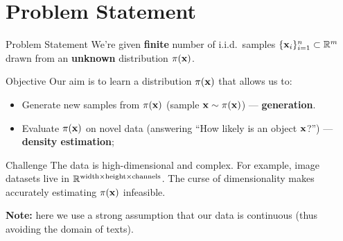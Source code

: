 \documentclass{beamer}
\begin{document}
\section{Problem Statement}
\begin{frame}{Problem Statement}
	We're given \textbf{finite} number of i.i.d.\ samples $\{\mathbf{x}_i\}_{i=1}^n \subset \mathbb{R}^m$ drawn from an \textbf{unknown} distribution $\pi(\mathbf{x})$.
	\eqpause
	\begin{block}{Objective}
		Our aim is to learn a distribution $\pi(\mathbf{x})$ that allows us to: 
		\begin{itemize}
		    \item Generate new samples from $\pi(\mathbf{x})$ (sample $\mathbf{x} \sim \pi(\mathbf{x})$) --- \textbf{generation}.		    
			\eqpause
		    \item Evaluate $\pi(\mathbf{x})$ on novel data (answering ``How likely is an object $\mathbf{x}$?'') --- \textbf{density estimation}; 
		\end{itemize}
	\end{block}
	\eqpause
	\begin{block}{Challenge}
		The data is high-dimensional and complex. For example, image datasets live in $\mathbb{R}^{\text{width} \times \text{height} \times \text{channels}}$. The curse of dimensionality makes accurately estimating $\pi(\mathbf{x})$ infeasible.
	\end{block}
	\eqpause
	\textbf{Note:} here we use a strong assumption that our data is continuous (thus avoiding the domain of texts).
\end{frame}
\end{document}
